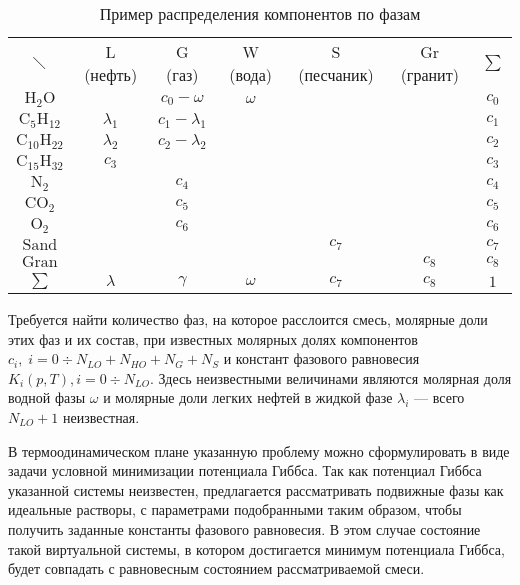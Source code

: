 ﻿\documentclass[12pt]{article}
\let\dividesymbol\div
\renewcommand{\div}{\operatorname{div}}
\begin{document}
\begin{table}[ht!]
\centering
\begin{tabular}{c|c|c|c|c|c|c}
\multicolumn{1}{c}{$\diagdown$}& \multicolumn{1}{c}{L (нефть)}& \multicolumn{1}{c}{G (газ)}& \multicolumn{1}{c}{W
(вода)}& \multicolumn{1}{c}{S (песчаник)}& Gr (гранит)&
$\sum$\\
\cline{2-6}
$\mathrm{H_2O}$& & $c_0 - \omega$ & $\omega$ & & & $c_0$\\
\cline{1-6}
$\mathrm{C_5H_{12}}$& $\lambda_1$ & $c_1 - \lambda_1$ & & & & $c_1$\\
\cline{2-6}
$\mathrm{C_{10}H_{22}}$& $\lambda_2$ & $c_2 - \lambda_2$ & & & & $c_2$\\
\cline{1-6}
$\mathrm{C_{15}H_{32}}$& $c_3$ & & & & & $c_3$\\
\cline{1-6}
$\mathrm{N_2}$& & $c_4$ & & & & $c_4$\\
\cline{2-6}
$\mathrm{CO_2}$& & $c_5$ & & & & $c_5$\\
\cline{2-6}
$\mathrm{O_2}$& & $c_6$ & & & & $c_6$\\
\cline{1-6}
$\mathrm{Sand}$& & & & $c_7$ & & $c_7$\\
\cline{2-6}
$\mathrm{Gran}$& & & & & $c_8$ & $c_8$\\
\cline{1-6} \multicolumn{1}{c}{$\sum$}& \multicolumn{1}{c}{$\lambda$}& \multicolumn{1}{c}{$\gamma$}&
\multicolumn{1}{c}{$\omega$}& \multicolumn{1}{c}{$c_7$}& \multicolumn{1}{c}{$c_8$}&
\multicolumn{1}{c}{$1$}\\
\end{tabular}
\caption{Пример распределения компонентов по фазам} \label{t:compphases}
\end{table}

Требуется найти количество фаз, на которое расслоится смесь, молярные доли этих фаз и их состав, при известных молярных
долях компонентов $c_i, \; i = 0 \dividesymbol N_{LO} + N_{HO} + N_{G} + N_{S}$ и констант фазового равновесия $K_i (p,
T), i = 0 \dividesymbol N_{LO} $. Здесь неизвестными величинами являются молярная доля водной фазы $ \omega $ и
молярные доли легких нефтей в жидкой фазе $ \lambda_i $ --- всего $N_{LO} + 1$ неизвестная.

В термоодинамическом плане указанную проблему можно сформулировать в виде задачи условной минимизации потенциала
Гиббса. Так как потенциал Гиббса указанной системы неизвестен, предлагается рассматривать подвижные фазы как идеальные
растворы, с параметрами подобранными таким образом, чтобы получить заданные константы фазового равновесия. В этом
случае состояние такой виртуальной системы, в котором достигается минимум потенциала Гиббса, будет совпадать с
равновесным состоянием рассматриваемой смеси.
\end{document}
